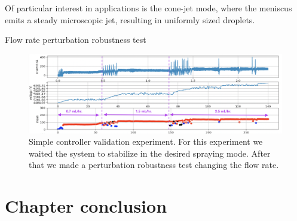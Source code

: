     Of particular interest in applications is the cone-jet mode, where the meniscus emits a steady microscopic jet, resulting in uniformly sized droplets. 

        Flow rate perturbation robustness test

        \begin{figure}[H]
            \center
            \includegraphics[width=17cm]{Figuras/19:03/control_first_results.png}
            \caption{Simple controller validation experiment. For this experiment we waited the system to stabilize in the desired spraying mode. After that we made a perturbation robustness test changing the flow rate.}
        \end{figure}


\section{Chapter conclusion}


\clearpage